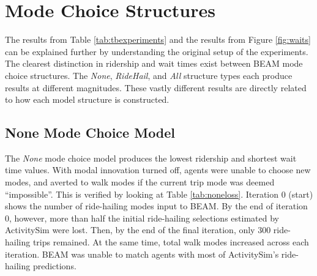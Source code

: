 \documentclass[fancy, masters]{byuthesis}
\begin{document}
\hypertarget{deep-look}{%
\section{Mode Choice Structures}\label{deep-look}}

The results from Table \ref{tab:tbexperiments} and the results from Figure \ref{fig:waits} can be explained further by understanding the original setup of the experiments. The clearest distinction in ridership and wait times exist between BEAM mode choice structures. The \emph{None}, \emph{RideHail}, and \emph{All} structure types each produce results at different magnitudes. These vastly different results are directly related to how each model structure is constructed.

\hypertarget{type1}{%
\subsection{None Mode Choice Model}\label{type1}}

The \emph{None} mode choice model produces the lowest ridership and shortest wait time values. With modal innovation turned off, agents were unable to choose new modes, and averted to walk modes if the current trip mode was deemed ``impossible''. This is verified by looking at Table \ref{tab:noneloss}. Iteration 0 (start) shows the number of ride-hailing modes input to BEAM. By the end of iteration 0, however, more than half the initial ride-hailing selections estimated by ActivitySim were lost. Then, by the end of the final iteration, only 300 ride-hailing trips remained. At the same time, total walk modes increased across each iteration. BEAM was unable to match agents with most of ActivitySim's ride-hailing predictions.

\begin{table}

\caption{\label{tab:noneloss}Loss of Ride-hailing Trips in the None Mode Choice Model.}
\centering
{}
\end{table}
\end{document}
